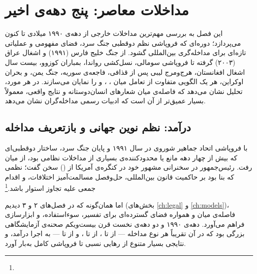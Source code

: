 \chapter{مداخلات معاصر: پنج دهه‌ی اخیر}
\label{ch:contemporary}

\begin{tcolorbox}[mybox, title={چکیده‌ی فصل}]
این فصل به بررسی مهم‌ترین مداخلات خارجی از دهه‌ی ۱۹۹۰ میلادی تا کنون می‌پردازد؛ دوره‌ای که فروپاشی نظم دوقطبی جنگ سرد، فضای مفهومی و عملیاتی تازه‌ای برای مداخله‌گری بین‌المللی گشود. از جنگ خلیج فارس (۱۹۹۱) و اشغال عراق (۲۰۰۳) گرفته تا فروپاشی سومالی، نسل‌کشی رواندا، بمباران کوزوو، بیست سال اشغال افغانستان، هرج‌ومرج لیبی پس از قذافی، فاجعه‌ی سوریه، جنگ یمن، و بحران اوکراین، هر یک الگویی متفاوت از تعامل میان ، ، و  را نمایان می‌سازند. در هر مورد، تحلیل  نشان می‌دهد که فاصله‌ی میان شعارهای انسان‌دوستانه و نتایج واقعی، معمولاً بسیار عمیق‌تر از آن است که ادبیات رسمی مداخله‌گران نشان می‌دهد.
\end{tcolorbox}

\section{درآمد: نظم نوین جهانی و بازتعریف مداخله}
\label{sec:ch10-intro}

با فروپاشی اتحاد جماهیر شوروی در سال ۱۹۹۱ و پایان جنگ سرد، ساختار دوقطبی‌ای که بیش از چهار دهه مانع یا محدودکننده‌ی بسیاری از مداخلات نظامی بود، از میان رفت. رئیس‌جمهور  در سخنرانی مشهور خود در کنگره‌ی آمریکا از  () سخن گفت؛ نظمی که بنا بود بر حاکمیت قانون بین‌المللی، حل‌وفصل مسالمت‌آمیز اختلافات، و اقدام جمعی علیه تجاوز استوار باشد.\footnote{}

اما همان‌گونه که در فصل‌های ۲ و ۳ دیدیم (بخش‌های \ref{ch:legal} و \ref{ch:models})، فاصله‌ی میان  و  همواره فضای گسترده‌ای برای تفسیر، سوءاستفاده، و ابزارسازی فراهم می‌آورد. دهه‌ی ۱۹۹۰ و دو دهه‌ی نخست قرن بیست‌ویکم صحنه‌ی آزمایشگاهی بزرگی بود که در آن تقریباً هر نوع مداخله — از  تا ، از  تا ، و از  تا  — به اجرا درآمد، و نتایجی بسیار متنوع از رهایی نسبی تا فروپاشی کامل به‌بار آورد.


